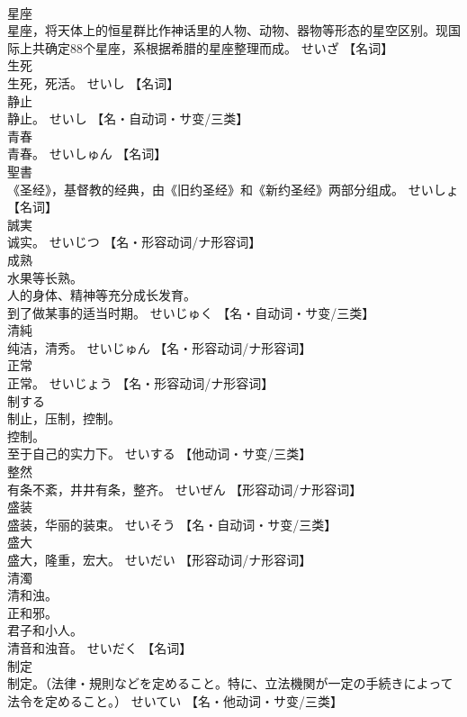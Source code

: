 \documentclass[8pt]{extreport}
\begin{document}
\begin{CJK}{UTF8}{min}
\\	星座	
\\	星座，将天体上的恒星群比作神话里的人物、动物、器物等形态的星空区别。现国际上共确定88个星座，系根据希腊的星座整理而成。	せいざ		【名词】
\\	生死	
\\	生死，死活。	せいし		【名词】
\\	静止	
\\	静止。	せいし		【名・自动词・サ变/三类】
\\	青春	
\\	青春。	せいしゅん		【名词】
\\	聖書	
\\	《圣经》，基督教的经典，由《旧约圣经》和《新约圣经》两部分组成。	せいしょ		【名词】
\\	誠実	
\\	诚实。	せいじつ		【名・形容动词/ナ形容词】
\\	成熟	
\\	水果等长熟。 
\\	人的身体、精神等充分成长发育。 
\\	到了做某事的适当时期。	せいじゅく		【名・自动词・サ变/三类】
\\	清純	
\\	纯洁，清秀。	せいじゅん		【名・形容动词/ナ形容词】
\\	正常	
\\	正常。	せいじょう		【名・形容动词/ナ形容词】
\\	制する	
\\	制止，压制，控制。 
\\	控制。 
\\	至于自己的实力下。	せいする		【他动词・サ变/三类】
\\	整然	
\\	有条不紊，井井有条，整齐。	せいぜん		【形容动词/ナ形容词】
\\	盛装	
\\	盛装，华丽的装束。	せいそう		【名・自动词・サ变/三类】
\\	盛大	
\\	盛大，隆重，宏大。	せいだい		【形容动词/ナ形容词】
\\	清濁	
\\	清和浊。 
\\	正和邪。 
\\	君子和小人。 
\\	清音和浊音。	せいだく		【名词】
\\	制定	
\\	制定。（法律・規則などを定めること。特に、立法機関が一定の手続きによって法令を定めること。）	せいてい		【名・他动词・サ变/三类】

\end{CJK}
\end{document}
